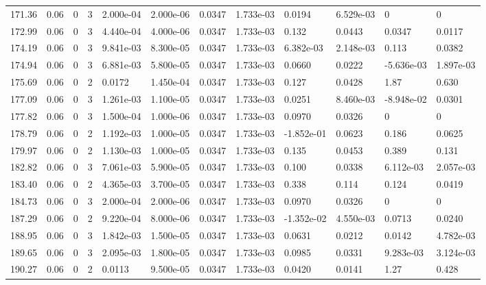 \documentclass[preview]{standalone}
\begin{document}
{{{{{\begin{tabular}{L{1.2cm}C{1.2cm} C{0.3cm}C{0.5cm} C{1.4cm}C{1.4cm} C{1.4cm}C{1.4cm} C{1.6cm}C{1.6cm} C{1.6cm}C{1.6cm}}
  171.36  &  0.06  & 0     &  3 &  2.000e-04  & 2.000e-06  &  0.0347&   1.733e-03& 0.0194 & 6.529e-03   &  0 & 0  \\ 
  172.99  &  0.06  & 0     &  3 &  4.440e-04  & 4.000e-06  &  0.0347&   1.733e-03& 0.132 & 0.0443   &  0.0347 & 0.0117  \\ 
  174.19  &  0.06  & 0     &  3 &  9.841e-03  & 8.300e-05  &  0.0347&   1.733e-03& 6.382e-03 & 2.148e-03   &  0.113 & 0.0382  \\ 
  174.94  &  0.06  & 0     &  3 &  6.881e-03  & 5.800e-05  &  0.0347&   1.733e-03& 0.0660 & 0.0222   &  -5.636e-03 & 1.897e-03  \\ 
  175.69  &  0.06  & 0     &  2 &  0.0172  & 1.450e-04  &  0.0347&   1.733e-03& 0.127 & 0.0428   &  1.87 & 0.630  \\ 
  177.09  &  0.06  & 0     &  3 &  1.261e-03  & 1.100e-05  &  0.0347&   1.733e-03& 0.0251 & 8.460e-03   &  -8.948e-02 & 0.0301  \\ 
  177.82  &  0.06  & 0     &  3 &  1.500e-04  & 1.000e-06  &  0.0347&   1.733e-03& 0.0970 & 0.0326   &  0 & 0  \\ 
  178.79  &  0.06  & 0     &  2 &  1.192e-03  & 1.000e-05  &  0.0347&   1.733e-03& -1.852e-01 & 0.0623   &  0.186 & 0.0625  \\ 
  179.97  &  0.06  & 0     &  2 &  1.130e-03  & 1.000e-05  &  0.0347&   1.733e-03& 0.135 & 0.0453   &  0.389 & 0.131  \\ 
  182.82  &  0.06  & 0     &  3 &  7.061e-03  & 5.900e-05  &  0.0347&   1.733e-03& 0.100 & 0.0338   &  6.112e-03 & 2.057e-03  \\ 
  183.40  &  0.06  & 0     &  2 &  4.365e-03  & 3.700e-05  &  0.0347&   1.733e-03& 0.338 & 0.114   &  0.124 & 0.0419  \\ 
  184.73  &  0.06  & 0     &  3 &  2.000e-04  & 2.000e-06  &  0.0347&   1.733e-03& 0.0970 & 0.0326   &  0 & 0  \\ 
  187.29  &  0.06  & 0     &  2 &  9.220e-04  & 8.000e-06  &  0.0347&   1.733e-03& -1.352e-02 & 4.550e-03   &  0.0713 & 0.0240  \\ 
  188.95  &  0.06  & 0     &  3 &  1.842e-03  & 1.500e-05  &  0.0347&   1.733e-03& 0.0631 & 0.0212   &  0.0142 & 4.782e-03  \\ 
  189.65  &  0.06  & 0     &  3 &  2.095e-03  & 1.800e-05  &  0.0347&   1.733e-03& 0.0985 & 0.0331   &  9.283e-03 & 3.124e-03  \\ 
  190.27  &  0.06  & 0     &  2 &  0.0113  & 9.500e-05  &  0.0347&   1.733e-03& 0.0420 & 0.0141   &  1.27 & 0.428  \\ 

\end{tabular}}}}}}
\end{document}
